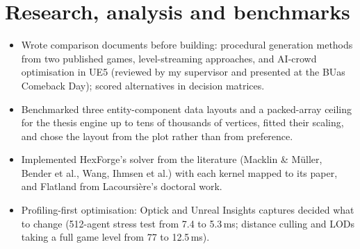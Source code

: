 \documentclass[10pt,a4paper]{article}
\begin{document}
\section{Research, analysis and benchmarks}
\begin{itemize}
\item Wrote comparison documents before building: procedural generation methods from two published games, level-streaming approaches, and AI-crowd optimisation in UE5 (reviewed by my supervisor and presented at the BUas Comeback Day); scored alternatives in decision matrices.
\item Benchmarked three entity-component data layouts and a packed-array ceiling for the thesis engine up to tens of thousands of vertices, fitted their scaling, and chose the layout from the plot rather than from preference.
\item Implemented HexForge's solver from the literature (Macklin \& M\"uller, Bender et al., Wang, Ihmsen et al.) with each kernel mapped to its paper, and Flatland from Lacoursi\`ere's doctoral work.
\item Profiling-first optimisation: Optick and Unreal Insights captures decided what to change (512-agent stress test from 7.4 to 5.3\,ms; distance culling and LODs taking a full game level from 77 to 12.5\,ms).
\end{itemize}

\end{document}
